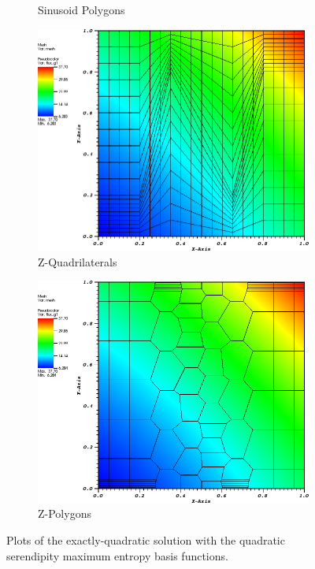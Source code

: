 \begin{figure}
{\begin{subfigure}[b]{0.465\textwidth}
		\caption{Sinusoid Polygons}
	\end{subfigure}
}
{
	\vspace{3mm}
	\begin{subfigure}[b]{0.465\textwidth}
		\centering
		\label{subfig::z_quad_me_k2_lin_sol}
		\includegraphics[width=\textwidth]{figures/sec_BF/quad_sol_zquad.png}
		\caption{Z-Quadrilaterals}
	\end{subfigure}
	\hfill
	\begin{subfigure}[b]{0.465\textwidth}
		\centering
		\label{subfig::z_poly_me_k2_lin_sol}
		\includegraphics[width=\textwidth]{figures/sec_BF/quad_sol_zpoly.png}
		\caption{Z-Polygons}
	\end{subfigure}
}
\caption{Plots of the exactly-quadratic solution with the quadratic serendipity maximum entropy basis functions.}
\label{fig::BF_Results_quad_sol}
\end{figure}

